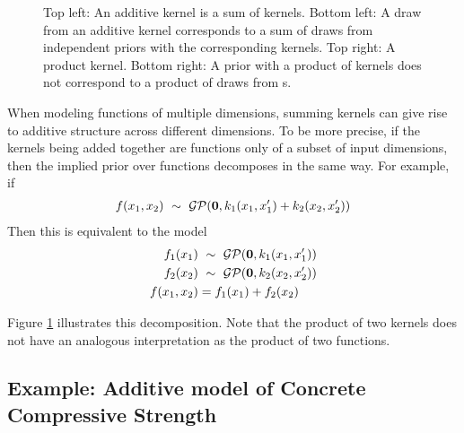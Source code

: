 \begin{figure}
\begin{tabular}{ccccc|c}
\end{tabular}
\caption[Additive kernels correspond to additive functions]{
Top left: An additive kernel is a sum of kernels.
Bottom left:  A draw from an additive kernel corresponds to a sum of draws from independent \gp{} priors with the corresponding kernels.
Top right: A product kernel.
Bottom right:  A \gp{} prior with a product of kernels does not correspond to a product of draws from \gp{}s.
}
\label{fig:kernels}
\end{figure}

When modeling functions of multiple dimensions, summing kernels can give rise to additive structure across different dimensions.
To be more precise, if the kernels being added together are functions only of a subset of input dimensions, then the implied prior over functions decomposes in the same way.
For example, if
%
\begin{align}
f(x_1, x_2) \ \sim\  \mathcal{GP}({\bf{0}}, k_1(x_1, x_1') + k_2(x_2, x_2'))
\end{align}
%
Then this is equivalent to the model
%
\begin{align}
f_1(x_1) & \ \sim\  \mathcal{GP}({\bf{0}}, k_1(x_1, x_1'))\\
f_2(x_2) & \ \sim\  \mathcal{GP}({\bf{0}}, k_2(x_2, x_2'))\\
f(x_1, x_2) & = f_1(x_1) + f_2(x_2)
\end{align}
%
%



Figure \ref{fig:kernels} illustrates this decomposition.
Note that the product of two kernels does not have an analogous interpretation as the product of two functions.




\subsection{Example: Additive model of Concrete Compressive Strength}
\label{sec:concrete}

